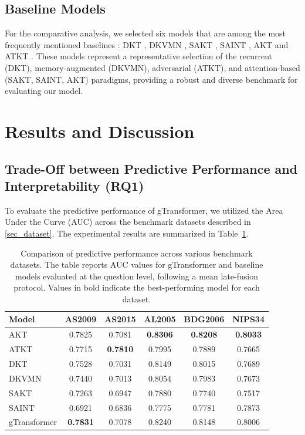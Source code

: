 \documentclass[applsci,article,submit,moreauthors,pdftex]{Definitions/mdpi}
\begin{document}
\subsection{Baseline Models}\label{sec_models}

For the comparative analysis, we selected six models that are among the most frequently mentioned baselines \citep{liu2022pykt}: DKT \citep{piech2015deep}, DKVMN \citep{zhang2017dynamic}, SAKT \citep{pandey2019self}, SAINT \citep{choi2020towards}, AKT \citep{ghosh2020context} and ATKT \citep{GuoHZTL21}. These models represent a representative selection of the recurrent (DKT), memory-augmented (DKVMN), adversarial (ATKT), and attention-based (SAKT, SAINT, AKT) paradigms, providing a robust and diverse benchmark for evaluating our model.


\section{Results and Discussion} \label{sec_results}

\subsection{Trade-Off between Predictive Performance and Interpretability (RQ1)} \label{sec_tradeoff}

To evaluate the predictive performance of gTransformer, we utilized the Area Under the Curve (AUC) across the benchmark datasets described in \cref{sec_dataset}. The experimental results are summarized in Table~\ref{tab_performance}.

\begin{table}[htbp]
\centering
\begin{tabularx}{\textwidth}{lccccc}
\toprule
\textbf{Model} & \textbf{AS2009} & \textbf{AS2015} & \textbf{AL2005} & \textbf{BDG2006} & \textbf{NIPS34} \\
\midrule
AKT & 0.7825 & 0.7081 & \textbf{0.8306} & \textbf{0.8208} & \textbf{0.8033} \\
ATKT & 0.7715 & \textbf{0.7810} & 0.7995 & 0.7889 & 0.7665 \\
DKT & 0.7528 & 0.7031 & 0.8149 & 0.8015 & 0.7689 \\
DKVMN & 0.7440 & 0.7013 & 0.8054 & 0.7983 & 0.7673 \\
SAKT & 0.7263 & 0.6947 & 0.7880 & 0.7740 & 0.7517 \\
SAINT & 0.6921 & 0.6836 & 0.7775 & 0.7781 & 0.7873 \\
\midrule
gTransformer & \textbf{0.7831} & 0.7078 & 0.8240 & 0.8148 & 0.8006 \\
\bottomrule
\end{tabularx}
\vspace{2mm}
\raggedright
\caption{Comparison of predictive performance across various benchmark datasets. The table reports AUC values for gTransformer and baseline models evaluated at the question level, following a mean late-fusion protocol. Values in bold indicate the best-performing model for each dataset. \label{tab_performance}}
\end{table}
\end{document}
